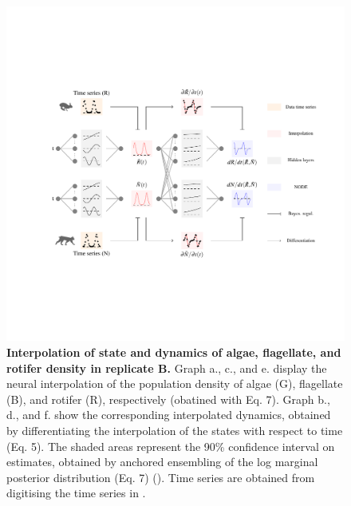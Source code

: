 \documentclass[11pt, oneside]{article}
\begin{document}
\begin{figure}[H]
\includegraphics[width=1\linewidth,page=10]{figures/main.pdf}
\caption{
    \textbf{Interpolation of state and dynamics of algae, flagellate, and rotifer density in replicate B.}
    Graph a., c., and e. display the neural interpolation of the population density of algae (G), flagellate (B), and rotifer (R), respectively (obatined with Eq. 7). 
    Graph b., d., and f. show the corresponding interpolated dynamics, obtained by differentiating the interpolation of the states with respect to time (Eq. 5).
    The shaded areas represent the 90\% confidence interval on estimates, obtained by anchored ensembling of the log marginal posterior distribution (Eq. 7) (\cite{Pearce2018}).
    Time series are obtained from digitising the time series in \cite{Hiltunen2013}.
}
\end{figure}
\newpage
\end{document}
